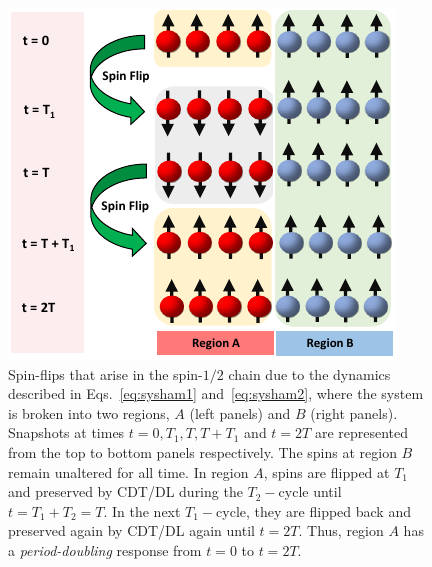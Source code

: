 \documentclass[%
nofootinbib,
reprint,
superscriptaddress,
amsmath,amssymb,showkeys,
aps,
prb,
]{revtex4-2}
\begin{document}
	\begin{figure}[t!]
		\centering
		\includegraphics[width=7.cm]{pic_regions.pdf}
		\caption{Spin-flips that arise in the spin-$1/2$ chain due to the dynamics described in Eqs.~\ref{eq:sysham1} and~\ref{eq:sysham2}, where the system is broken into two regions, $A$ (left panels) and $B$ (right panels). Snapshots at times $t=0, T_1, T, T+T_1 $ and $t=2T$ are represented from the top to bottom panels respectively. The spins at region $B$ remain unaltered for all time. In region $A$, spins are flipped at $T_1$ and preserved by CDT/DL during the $T_2-$cycle until $t=T_1+T_2=T$. In the next $T_1-$cycle, they are flipped back and preserved again by CDT/DL again until $t=2T$. Thus, region $A$ has a \textit{period-doubling} response from $t=0$ to $t=2T$.}
		\label{Fig:spinflip}
	\end{figure}
\end{document}
